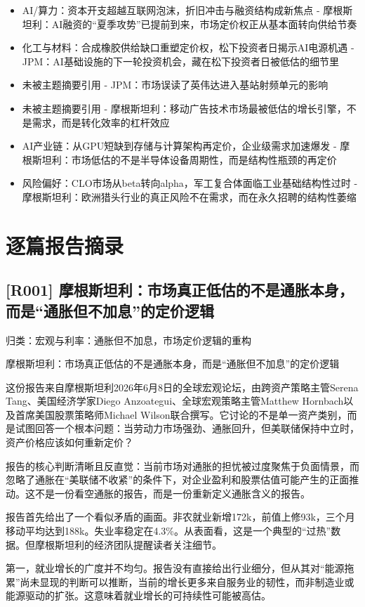 \documentclass[11pt]{ctexart}
\begin{document}
\begin{itemize}
  \item [R044] AI/算力：资本开支超越互联网泡沫，折旧冲击与融资结构成新焦点 - 摩根斯坦利：AI融资的“夏季攻势”已提前到来，市场定价权正从基本面转向供给节奏
  \item [R045] 化工与材料：合成橡胶供给缺口重塑定价权，松下投资者日揭示AI电源机遇 - JPM：AI基础设施的下一轮投资机会，藏在松下投资者日被低估的细节里
  \item [R046] 未被主题摘要引用 - JPM：市场误读了英伟达进入基站射频单元的影响
  \item [R047] 未被主题摘要引用 - 摩根斯坦利：移动广告技术市场最被低估的增长引擎，不是需求，而是转化效率的杠杆效应
  \item [R048] AI产业链：从GPU短缺到存储与计算架构再定价，企业级需求加速爆发 - 摩根斯坦利：市场低估的不是半导体设备周期性，而是结构性瓶颈的再定价
  \item [R049] 风险偏好：CLO市场从beta转向alpha，军工复合体面临工业基础结构性过时 - 摩根斯坦利：欧洲猎头行业的真正风险不在需求，而在永久招聘的结构性萎缩
\end{itemize}
\section{逐篇报告摘录}
\subsection{[R001] 摩根斯坦利：市场真正低估的不是通胀本身，而是“通胀但不加息”的定价逻辑}
{\small\color{refgray}归类：宏观与利率：通胀但不加息，市场定价逻辑的重构}

摩根斯坦利：市场真正低估的不是通胀本身，而是“通胀但不加息”的定价逻辑

这份报告来自摩根斯坦利2026年6月8日的全球宏观论坛，由跨资产策略主管Serena Tang、美国经济学家Diego Anzoategui、全球宏观策略主管Matthew Hornbach以及首席美国股票策略师Michael Wilson联合撰写。它讨论的不是单一资产类别，而是试图回答一个根本问题：当劳动力市场强劲、通胀回升，但美联储保持中立时，资产价格应该如何重新定价？

报告的核心判断清晰且反直觉：当前市场对通胀的担忧被过度聚焦于负面情景，而忽略了通胀在“美联储不收紧”的条件下，对企业盈利和股票估值可能产生的正面推动。这不是一份看空通胀的报告，而是一份重新定义通胀含义的报告。

报告首先给出了一个看似矛盾的画面。非农就业新增172k，前值上修93k，三个月移动平均达到188k。失业率稳定在4.3\%。从表面看，这是一个典型的“过热”数据。但摩根斯坦利的经济团队提醒读者关注细节。

第一，就业增长的广度并不均匀。报告没有直接给出行业细分，但从其对“能源拖累”尚未显现的判断可以推断，当前的增长更多来自服务业的韧性，而非制造业或能源驱动的扩张。这意味着就业增长的可持续性可能被高估。
\end{document}
